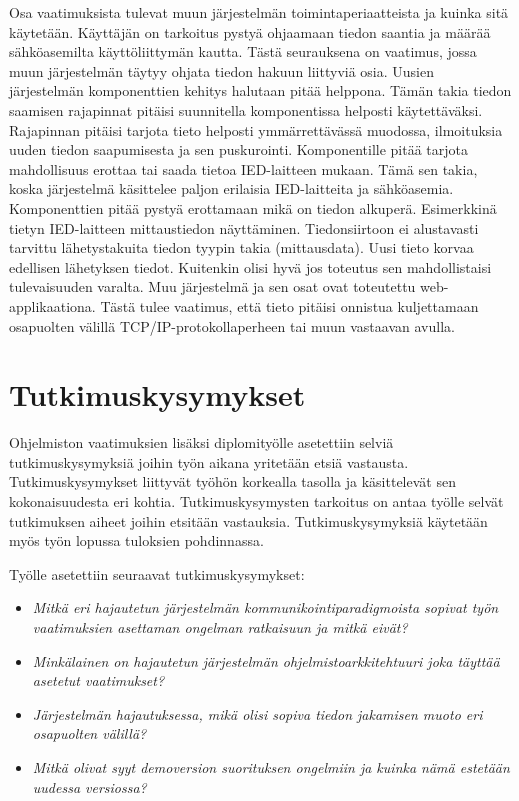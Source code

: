 Osa vaatimuksista tulevat muun järjestelmän toimintaperiaatteista ja kuinka sitä käytetään. Käyttäjän on tarkoitus pystyä ohjaamaan tiedon saantia ja määrää sähköasemilta käyttöliittymän kautta. Tästä seurauksena on vaatimus, jossa muun järjestelmän täytyy ohjata tiedon hakuun liittyviä osia. Uusien järjestelmän komponenttien kehitys halutaan pitää helppona. Tämän takia tiedon saamisen rajapinnat pitäisi suunnitella komponentissa helposti käytettäväksi. Rajapinnan pitäisi tarjota tieto helposti ymmärrettävässä muodossa, ilmoituksia uuden tiedon saapumisesta ja sen puskurointi. Komponentille pitää tarjota mahdollisuus erottaa tai saada tietoa IED-laitteen mukaan. Tämä sen takia, koska järjestelmä käsittelee paljon erilaisia IED-laitteita ja sähköasemia. Komponenttien pitää pystyä erottamaan mikä on tiedon alkuperä. Esimerkkinä tietyn IED-laitteen mittaustiedon näyttäminen. Tiedonsiirtoon ei alustavasti tarvittu lähetystakuita tiedon tyypin takia (mittausdata). Uusi tieto korvaa edellisen lähetyksen tiedot. Kuitenkin olisi hyvä jos toteutus sen mahdollistaisi tulevaisuuden varalta. Muu järjestelmä ja sen osat ovat toteutettu web-applikaationa. Tästä tulee vaatimus, että tieto pitäisi onnistua kuljettamaan osapuolten välillä TCP/IP-protokollaperheen tai muun vastaavan avulla.


\section{Tutkimuskysymykset}
Ohjelmiston vaatimuksien lisäksi diplomityölle asetettiin selviä tutkimuskysymyksiä joihin työn aikana yritetään etsiä vastausta. Tutkimuskysymykset liittyvät työhön korkealla tasolla ja käsittelevät sen kokonaisuudesta eri kohtia. Tutkimuskysymysten tarkoitus on antaa työlle selvät tutkimuksen aiheet joihin etsitään vastauksia. Tutkimuskysymyksiä käytetään myös työn lopussa tuloksien pohdinnassa.

Työlle asetettiin seuraavat tutkimuskysymykset:
\begin{itemize}
	\item \emph{Mitkä eri hajautetun järjestelmän kommunikointiparadigmoista sopivat työn vaatimuksien asettaman ongelman ratkaisuun ja mitkä eivät?}
	\item \emph{Minkälainen on hajautetun järjestelmän ohjelmistoarkkitehtuuri joka täyttää asetetut vaatimukset?}
	\item \emph{Järjestelmän hajautuksessa, mikä olisi sopiva tiedon jakamisen muoto eri osapuolten välillä?}
	\item \emph{Mitkä olivat syyt demoversion suorituksen ongelmiin ja kuinka nämä estetään uudessa versiossa?}
\end{itemize}